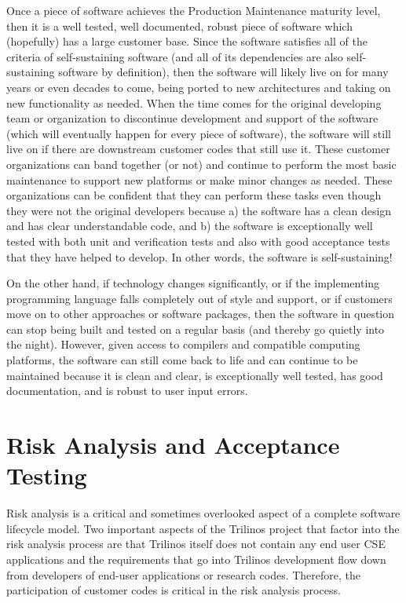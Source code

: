 \documentclass[11pt]{SANDreport}
\begin{document}
Once a piece of software achieves the Production Maintenance maturity
level, then it is a well tested, well documented, robust piece of
software which (hopefully) has a large customer base.  Since the
software satisfies all of the criteria of self-sustaining software
(and all of its dependencies are also self-sustaining software by
definition), then the software will likely live on for many years or
even decades to come, being ported to new architectures and taking on
new functionality as needed.  When the time comes for the original
developing team or organization to discontinue development and support
of the software (which will eventually happen for every piece of
software), the software will still live on if there are downstream
customer codes that still use it.  These customer organizations can
band together (or not) and continue to perform the most basic
maintenance to support new platforms or make minor changes as needed.
These organizations can be confident that they can perform these tasks
even though they were not the original developers because a) the
software has a clean design and has clear understandable code, and b)
the software is exceptionally well tested with both unit and
verification tests and also with good acceptance tests that they have
helped to develop.  In other words, the software is self-sustaining!

On the other hand, if technology changes significantly, or if the
implementing programming language falls completely out of style and
support, or if customers move on to other approaches or software
packages, then the software in question can stop being built and
tested on a regular basis (and thereby go quietly into the night).
However, given access to compilers and compatible computing
platforms, the software can still come back to life and can continue
to be maintained because it is clean and clear, is exceptionally well
tested, has good documentation, and is robust to user input errors.


%
{}\section{Risk Analysis and Acceptance Testing}
\label{sec:risk_analysis_acceptance_testing}
%

Risk analysis is a critical and sometimes overlooked aspect of a complete
software lifecycle model.  Two important aspects of the Trilinos project that
factor into the risk analysis process are that Trilinos itself does not
contain any end user CSE applications and the requirements that go into
Trilinos development flow down from developers of end-user applications or
research codes.  Therefore, the participation of customer codes is critical
in the risk analysis process.
\end{document}
